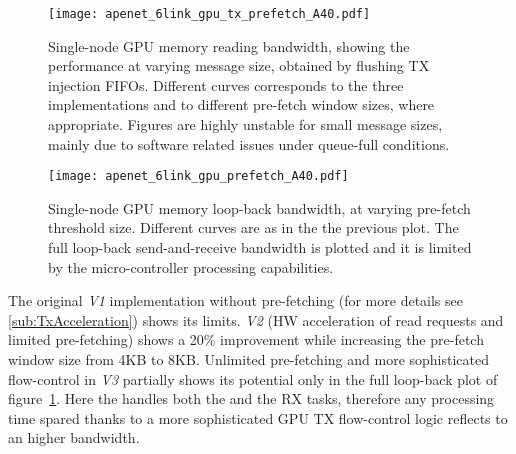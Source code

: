 \begin{figure}[t]

 \begin{minipage}[t]{0.48\textwidth}
   \centering
   \texttt{[image: apenet\_6link\_gpu\_tx\_prefetch\_A40.pdf]}
   \caption{Single-node GPU memory reading bandwidth, showing the
  performance at varying message size, obtained by flushing TX
  injection FIFOs. Different curves corresponds to the three \ptoptx
  implementations and to different pre-fetch window sizes, where
  appropriate. Figures are highly unstable for small message sizes,
  mainly due to software related issues under queue-full conditions.}
 \label{fig:gpu_tx_prefetch_bw}  
 \end{minipage}
 \hspace{3mm}
 \begin{minipage}[t]{0.48\textwidth}
 \centering
 \texttt{[image: apenet\_6link\_gpu\_prefetch\_A40.pdf]}
 \caption{Single-node GPU memory loop-back bandwidth, at varying
  pre-fetch threshold size. Different curves are as in the the
  previous plot. The full loop-back send-and-receive bandwidth is
  plotted and it is limited by the \nios \mbox{micro-controller}
  processing capabilities. }
 \label{fig:gpu_prefetch_bw}
 \end{minipage}
\end{figure}


The original \textit{V1} \ptoptx implementation without pre-fetching (for more
details see \ref{sub:TxAcceleration}) shows its limits.
\ptoptx \textit{V2} (HW acceleration of read requests and limited pre-fetching)
shows a 20\% improvement while increasing the pre-fetch window size
from 4KB to 8KB.
Unlimited pre-fetching and more sophisticated flow-control in \ptoptx
\textit{V3} partially shows its potential only in the full loop-back plot of
figure~\ref{fig:gpu_prefetch_bw}.
Here the \nios handles both the \ptoptx and the RX tasks, therefore
any processing time spared thanks to a more sophisticated GPU TX
flow-control logic reflects to an higher bandwidth.


